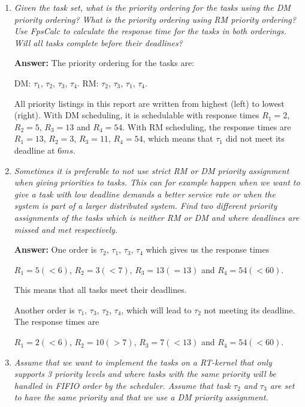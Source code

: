 \documentclass[a4paper,10pt]{article}
\newcommand{\answer}{\textbf{Answer: }}
\begin{document}
\begin{enumerate}
	\item \emph{Given the task set, what is the priority ordering for the tasks using the DM priority ordering? What is the priority ordering using RM priority ordering? Use FpsCalc to calculate the response time for the tasks in both orderings. Will all tasks complete before their deadlines?}
	
	\answer The priority ordering for the tasks are:
	
	DM: $\tau_1$, $\tau_2$, $\tau_3$, $\tau_4$.
	RM: $\tau_2$, $\tau_3$, $\tau_1$, $\tau_4$.
	
	All priority listings in this report are written from highest (left) to lowest (right). With DM scheduling, it is schedulable with response times $R_1 = 2$, $R_2 = 5$, $R_3 = 13$ and $R_4 = 54$. With RM scheduling, the response times are $R_1 = 13$, $R_2 = 3$, $R_3 = 11$, $R_4 = 54$, which means that $\tau_1$ did not meet its deadline at $6ms$.
	
	
	\item \emph{Sometimes it is preferable to not use strict RM or DM priority assignment when giving priorities to tasks. This can for example happen when we want to give a task with low deadline demands a better service rate or when the system is part of a larger distributed system. Find two different priority assignments of the tasks which is neither RM or DM and where deadlines are missed and met respectively.}
	
	\answer One order is $\tau_2$, $\tau_1$, $\tau_3$, $\tau_4$ which gives us the response times 
	
	$R_1 = 5 (< 6)$, $R_2 = 3 (< 7)$, $R_3 = 13 (= 13)$ and $R_4 = 54 (< 60)$. 
	
	This means that all tasks meet their deadlines.

	
	Another order is $\tau_1$, $\tau_3$, $\tau_2$, $\tau_4$, which will lead to $\tau_2$ not meeting its deadline. The response times are
	
	$R_1 = 2 (< 6)$, $R_2 = 10 (> 7)$, $R_3 = 7 (< 13)$ and $R_4 = 54 (< 60)$.
	
	
	\item \emph{Assume that we want to implement the tasks on a RT-kernel that only supports 3 priority levels and where tasks with the same priority will be handled in FIFIO order by the scheduler. Assume that task $\tau_2$ and $\tau_3$ are set to have the same priority and that we use a DM priority assignment.}
	

\end{enumerate}
\end{document}
